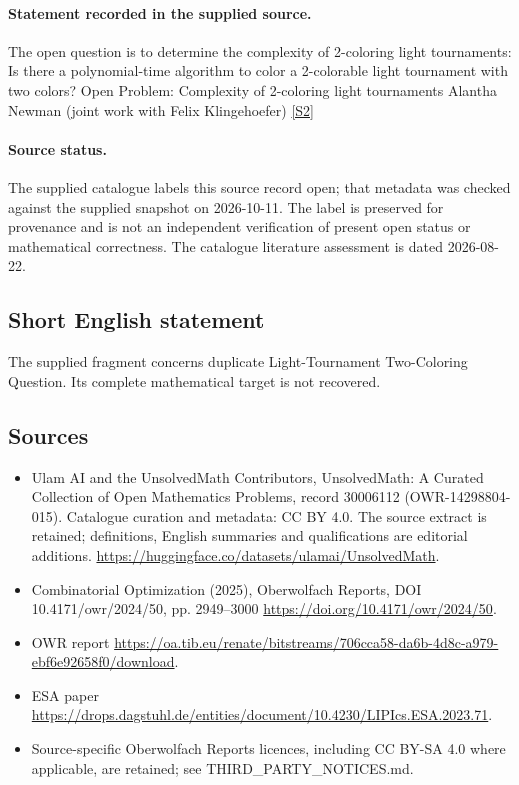 \documentclass[11pt]{article}
\newcommand{\sref}[2]{\hyperlink{source:#1:#2}{[S#2]}}
\begin{document}
\paragraph{Statement recorded in the supplied source.}
The open question is to determine the complexity of 2-coloring light tournaments: Is there a polynomial-time algorithm to color a 2-colorable light tournament with two colors? Open Problem: Complexity of 2-coloring light tournaments Alantha Newman (joint work with Felix Klingehoefer) \sref{30006112}{2}
\paragraph{Source status.}
The supplied catalogue labels this source record open; that metadata was checked against the supplied snapshot on 2026-10-11. The label is preserved for provenance and is not an independent verification of present open status or mathematical correctness. The catalogue literature assessment is dated 2026-08-22.
\subsection{Short English statement}
The supplied fragment concerns duplicate Light-Tournament Two-Coloring Question. Its complete mathematical target is not recovered.
\subsection{Sources}
\begin{itemize}
\item[\hypertarget{source:30006112:1}{S1}] Ulam AI and the UnsolvedMath Contributors, UnsolvedMath: A Curated Collection of Open Mathematics Problems, record 30006112 (OWR-14298804-015). Catalogue curation and metadata: CC BY 4.0. The source extract is retained; definitions, English summaries and qualifications are editorial additions.
\url{https://huggingface.co/datasets/ulamai/UnsolvedMath}.
\item[\hypertarget{source:30006112:2}{S2}] Combinatorial Optimization (2025), Oberwolfach Reports, DOI 10.4171/owr/2024/50, pp. 2949--3000
\url{https://doi.org/10.4171/owr/2024/50}.
\item[\hypertarget{source:30006112:3}{S3}] OWR report
\url{https://oa.tib.eu/renate/bitstreams/706cca58-da6b-4d8c-a979-ebf6e92658f0/download}.
\item[\hypertarget{source:30006112:4}{S4}] ESA paper
\url{https://drops.dagstuhl.de/entities/document/10.4230/LIPIcs.ESA.2023.71}.
\item Source-specific Oberwolfach Reports licences, including CC BY-SA 4.0 where applicable, are retained; see THIRD\_PARTY\_NOTICES.md.
\end{itemize}
\end{document}
